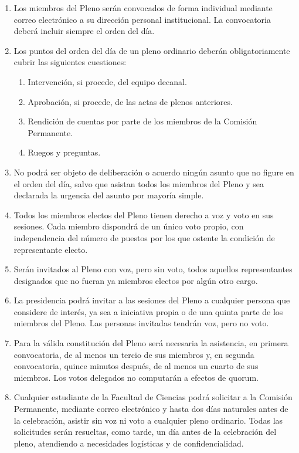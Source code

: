 \documentclass[11pt,a4paper]{article}
\begin{document}
\begin{enumerate}
\item Los miembros del Pleno serán convocados de forma individual mediante correo electrónico a su dirección personal institucional. La convocatoria deberá incluir siempre el orden del día.
\item Los puntos del orden del día de un pleno ordinario deberán obligatoriamente cubrir las siguientes cuestiones:
  \begin{enumerate}
    \item Intervención, si procede, del equipo decanal.
    \item Aprobación, si procede, de las actas de plenos anteriores.
    \item Rendición de cuentas por parte de los miembros de la Comisión Permanente.
    \item Ruegos y preguntas.
  \end{enumerate}
\item No podrá ser objeto de deliberación o acuerdo ningún asunto que no figure en el orden del día, salvo que asistan todos los miembros del Pleno y sea declarada la urgencia del asunto por mayoría simple.
\item Todos los miembros electos del Pleno tienen derecho a voz y voto en sus sesiones. Cada miembro dispondrá de un único voto propio, con independencia del número de puestos por los que ostente la condición de representante electo.
\item Serán invitados al Pleno con voz, pero sin voto, todos aquellos representantes designados que no fueran ya miembros electos por algún otro cargo.
\item La presidencia podrá invitar a las sesiones del Pleno a cualquier persona que considere de interés, ya sea a iniciativa propia o de una quinta parte de los miembros del Pleno. Las personas invitadas tendrán voz, pero no voto.
\item Para la válida constitución del Pleno será necesaria la asistencia, en primera convocatoria, de al menos un tercio de sus miembros y, en segunda convocatoria, quince minutos después, de al menos un cuarto de sus miembros. Los votos delegados no computarán a efectos de quorum.
\item Cualquier estudiante de la Facultad de Ciencias podrá solicitar a la Comisión Permanente, mediante correo electrónico y hasta dos días naturales antes de la celebración, asistir sin voz ni voto a cualquier pleno ordinario. Todas las solicitudes serán resueltas, como tarde, un día antes de la celebración del pleno, atendiendo a necesidades logísticas y de confidencialidad.

\end{enumerate}
\end{document}
